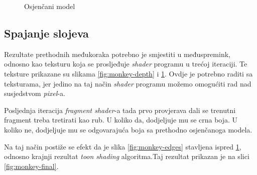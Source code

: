 \begin{figure}[H]
\centering{}
\caption{Osjenčani model}
\label{fig:monkey-toon}
\end{figure}

\subsection{Spajanje slojeva}

Rezultate prethodnih međukoraka potrebno je smjestiti u međuspremink, odnosno kao teksturu koja se prosljeđuje \emph{shader} programu u trećoj iteraciji. Te teksture prikazane su slikama \ref{fig:monkey-depth} i \ref{fig:monkey-toon}. Ovdje je potrebno raditi sa teksturama, jer jedino na taj način \emph{shader} programu možemo omogućiti rad nad susjedstvom \emph{pixel}-a.

Posljednja iteracija \emph{fragment shader}-a tada prvo provjerava dali se trenutni fragment treba tretirati kao rub. U koliko da, dodjeljuje mu se crna boja. U koliko ne, dodjeljuje mu se odgovarajuća boja sa prethodno osjenčanoga modela.

Na taj način postiže se efekt da je slika \ref{fig:monkey-edges} stavljena ispred \ref{fig:monkey-toon}, odnosno krajnji rezultat \emph{toon shading} algoritma.Taj rezultat prikazan je na slici \ref{fig:monkey-final}.

